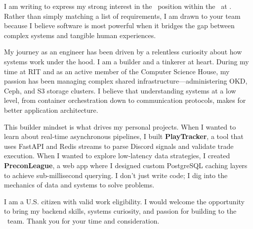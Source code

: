 I am writing to express my strong interest in the \jobtitle\ position \ifx\department\empty\else within the \department\ \fi at \company. Rather than simply matching a list of requirements, I am drawn to your team because I believe software is most powerful when it bridges the gap between complex systems and tangible human experiences. \companyfit

My journey as an engineer has been driven by a relentless curiosity about how systems work under the hood. I am a builder and a tinkerer at heart. During my time at RIT and as an active member of the Computer Science House, my passion has been managing complex shared infrastructure—administering OKD, Ceph, and S3 storage clusters. I believe that understanding systems at a low level, from container orchestration down to communication protocols, makes for better application architecture. 

This builder mindset is what drives my personal projects. When I wanted to learn about real-time asynchronous pipelines, I built \textbf{PlayTracker}, a tool that uses FastAPI and Redis streams to parse Discord signals and validate trade execution. When I wanted to explore low-latency data strategies, I created \textbf{PreconLeague}, a web app where I designed custom PostgreSQL caching layers to achieve sub-millisecond querying. I don't just write code; I dig into the mechanics of data and systems to solve problems.

I am a U.S. citizen with valid work eligibility. I would welcome the opportunity to bring my backend skills, systems curiosity, and passion for building to the \company\ team. Thank you for your time and consideration.
